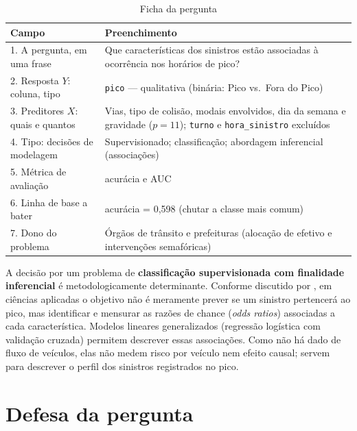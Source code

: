 \documentclass[
  article,
  12pt,
  oneside,
  a4paper,
  english,
  brazil
]{abntex2}\usepackage[]{graphicx}\usepackage[]{xcolor}
\begin{document}
\begin{table}[htb]
  \centering
  \caption{Ficha da pergunta}
  \label{tab:ficha}
  \footnotesize
  \begin{tabular}{@{}p{}p{}@{}}
    \toprule
    \textbf{Campo} & \textbf{Preenchimento} \\
    \midrule
    1. A pergunta, em uma frase & Que características dos sinistros estão associadas à ocorrência nos horários de pico? \\
    2. Resposta $Y$: coluna, tipo & \texttt{pico} --- qualitativa (binária: Pico vs.\ Fora do Pico) \\
    3. Preditores $X$: quais e quantos & Vias, tipo de colisão, modais envolvidos, dia da semana e gravidade ($p = \text{11}$); \texttt{turno} e \texttt{hora\_sinistro} excluídos \\
    4. Tipo: decisões de modelagem & Supervisionado; classifica\c{c}\~ao; abordagem inferencial (associações) \\
    5. Métrica de avaliação & acur\'acia e AUC \\
    6. Linha de base a bater & acur\'acia = 0,598 \quad (chutar a classe mais comum) \\
    7. Dono do problema & Órgãos de trânsito e prefeituras (alocação de efetivo e intervenções semafóricas) \\
    \bottomrule
  \end{tabular}
\end{table}

A decisão por um problema de \textbf{classificação supervisionada com finalidade inferencial} é metodologicamente determinante. Conforme discutido por , em ciências aplicadas o objetivo não é meramente prever se um sinistro pertencerá ao pico, mas identificar e mensurar as razões de chance (\textit{odds ratios}) associadas a cada característica. Modelos lineares generalizados (regressão logística com validação cruzada) permitem descrever essas associações. Como não há dado de fluxo de veículos, elas não medem risco por veículo nem efeito causal; servem para descrever o perfil dos sinistros registrados no pico.

\section{Defesa da pergunta}
\end{document}
